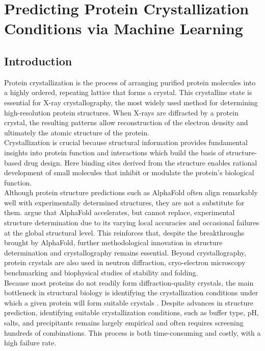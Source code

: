 \chapter{Predicting Protein Crystallization Conditions via Machine Learning} %

\label{chapter:entry} 

\section{Introduction}\label{sec:introduction}
Protein crystallization is the process of arranging purified protein molecules into a highly ordered, repeating lattice that forms a crystal. This crystalline state is essential for X-ray crystallography, the most widely used method for determining high-resolution protein structures. When X-rays are diffracted by a protein crystal, the resulting patterns allow reconstruction of the electron density and ultimately the atomic structure of the protein. \\
Crystallization is crucial because structural information provides fundamental insights into protein function and interactions which build the basis of structure-based drug design. Here binding sites derived from the structure enables rational development of small molecules that inhibit or modulate the protein's biological function. \\
Although protein structure predictions such as AlphaFold often align remarkably well with experimentally determined structures, they are not a substitute for them. \textcite{Terwilliger2024} argue that AlphaFold accelerates, but cannot replace, experimental structure determination due to its varying local accuracies and occasional failures at the global structural level. This reinforces that, despite the breakthroughs brought by AlphaFold, further methodological innovation in structure determination and crystallography remains essential.
Beyond crystallography, protein crystals are also used in neutron diffraction, cryo-electron microscopy benchmarking and biophysical studies of stability and folding. \\
Because most proteins do not readily form diffraction-quality crystals, the main bottleneck in structural biology is identifying the crystallization conditions under which a given protein will form suitable crystals \parencite{Mall2025}. Despite advances in structure prediction, identifying suitable crystallization conditions, such as buffer type, pH, salts, and precipitants remains largely empirical and often requires screening hundreds of combinations. This process is both time-consuming and costly, with a high failure rate.

